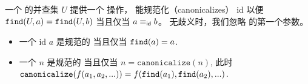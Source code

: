\begin{definition}[规范化]
    一个 \egraph 的并查集 $U$ 提供一个 \find 操作， 能规范化（canonicalizes） \eclass id
      以便 ${\texttt{find}(U, a) = \texttt{find}(U, b)}$ 当且仅当 ${a \equiv_{\sf id} b}$。 %
    无歧义时，我们忽略 \find 的第一个参数。
    \begin{itemize}
      \item 一个 \eclass id $a$ 是规范的 当且仅当 $\texttt{find}(a) = a$.
      \item \raggedright
            一个 \enode $n$ 是规范的 当且仅当 $n = \texttt{canonicalize}(n)$,
            此时  %
            ${\texttt{canonicalize}(f(a_{1}, a_{2}, ...)) = f(\texttt{find}(a_{1}), \texttt{find}(a_{2}), ...)}$. 
    \end{itemize}
\end{definition}


